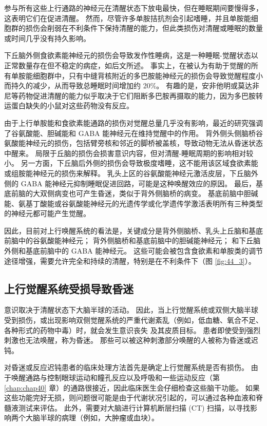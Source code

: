 参与所有这些上行通路的神经元在清醒状态下放电最快，但在睡眠期间要慢得多，这表明它们在促进清醒。
然而，尽管许多单胺拮抗剂会引起嗜睡，并且单胺能细胞群的损伤会削弱在不利条件下保持清醒的能力，但此类损伤对清醒或睡眠的数量或时间几乎没有持久影响。


下丘脑外侧食欲素能神经元的损伤会导致发作性睡病，这是一种睡眠-觉醒状态以正常数量存在但不稳定的病症，如后文所述。
事实上，在被认为有助于觉醒的所有单胺能细胞群中，只有中缝背核附近的多巴胺能神经元的损伤会导致觉醒程度小而持久的减少，从而导致总睡眠时间增加约 20\%。
有趣的是，安非他明或莫达非尼等药物促进清醒的能力似乎取决于它们阻断多巴胺再摄取的能力，因为多巴胺转运蛋白缺失的小鼠对这些药物没有反应。


由于上行单胺能和食欲素能通路的损伤对觉醒总量几乎没有影响，最近的研究强调了谷氨酸能、胆碱能和 GABA 能神经元在维持觉醒中的作用。
背外侧头侧脑桥谷氨酸能神经元的损伤，包括臂旁核和邻近的脚桥被盖核，导致动物无法从昏迷状态中醒来。
局限于丘脑的损伤会损害意识内容，但对清醒-睡眠周期的影响相对较小。
另一方面，下丘脑后外侧的损伤会导致极度嗜睡，这不能用该区域食欲素能或组胺能神经元的损伤来解释。
乳头上区的谷氨酸能神经元激活皮层，下丘脑外侧的 GABA 能神经元抑制睡眠促进回路，可能是这种唤醒效应的原因。
最后，基底前脑的大双侧病变也可产生昏迷，类似于背外侧脑桥的病变。
基底前脑中胆碱能、氨基丁酸能或谷氨酸能神经元的光遗传学或化学遗传学激活表明所有三种类型的神经元都可能产生觉醒。


因此，目前对上行唤醒系统的看法是，关键成分是背外侧脑桥、乳头上丘脑和基底前脑中的谷氨酸能神经元；
背外侧脑桥和基底前脑中的胆碱能神经元；
和下丘脑外侧和基底前脑中的 GABA 能神经元。
这些可能会被包含食欲素和单胺类的调节途径增强，需要允许完全和持续的清醒，特别是在不利条件下（图 \ref{fig:44_3}）。



\subsection{上行觉醒系统受损导致昏迷}

意识取决于清醒状态下大脑半球的活动。
因此，当上行觉醒系统或双侧大脑半球受到损伤，或出现影响双侧觉醒系统的严重代谢紊乱（例如，低血糖、氧合不足、各种形式的药物中毒）时，就会发生意识丧失 及其皮质目标。
患者即使受到强烈刺激也无法唤醒，称为昏迷。
那些可以被这种刺激部分唤醒的人被称为昏迷或迟钝。


对昏迷或反应迟钝患者的临床处理方法首先是确定上行觉醒系统是否有损伤。
由于唤醒通路与控制眼球运动和瞳孔反应以及呼吸和一些运动反应（第 \ref{chap:chap40} 章）的通路很接近，因此临床医生会仔细检查这些脑干功能。
如果这些功能完好无损，则问题很可能是由于代谢状况引起的，可以通过各种血液和脊髓液测试来评估。
此外，需要对大脑进行计算机断层扫描 (CT) 扫描，以寻找影响两个大脑半球的病理（例如，大肿瘤或血块）。


